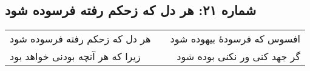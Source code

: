 \begin{center}
\section*{شماره ۲۱: هر دل که زحکم رفته فرسوده شود}
\label{sec:021}
\begin{longtable}{l p{0.5cm} r}
هر دل که زحکم رفته فرسوده شود
&&
افسوس که فرسودهٔ بیهوده شود
\\
زیرا که هر آنچه بودنی خواهد بود
&&
گر جهد کنی ور نکنی بوده شود
\\
\end{longtable}
\end{center}
